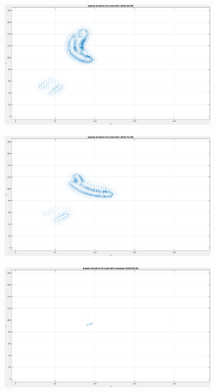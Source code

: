 \begin{figure}[tb]
\centering
\begin{subfigure}{.45\textwidth}
  \centering
  \includegraphics[height=.6\linewidth]{figs/baelle/baelle-1.png}
  \caption{}
\label{fig:baelle-snapshots1}
\end{subfigure}
\begin{subfigure}{.45\textwidth}
  \centering
  \includegraphics[height=.6\linewidth]{figs/baelle/baelle-2.png}
  \caption{}
  \label{fig:baelle-snapshots2}
\end{subfigure}
\begin{subfigure}{.45\textwidth}
  \includegraphics[height=.6\linewidth]{figs/baelle/baelle-masked-1.png}

\end{subfigure}
\end{figure}
